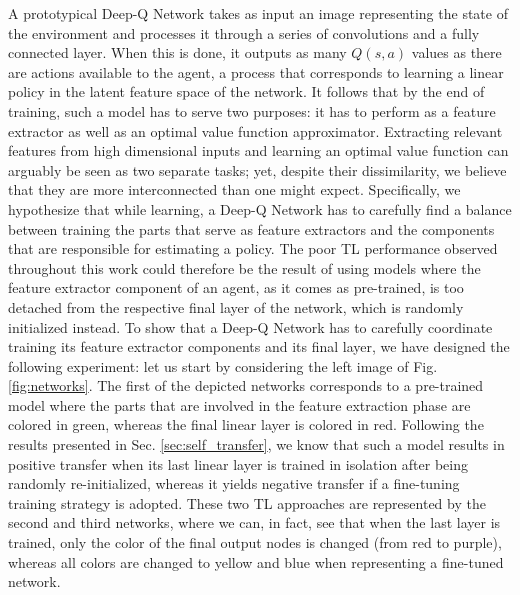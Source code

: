 A prototypical Deep-Q Network takes as input an image representing the state of the environment and processes it through a series of convolutions and a fully connected layer. When this is done, it outputs as many $Q(s,a)$ values as there are actions available to the agent, a process that corresponds to learning a linear policy in the latent feature space of the network. It follows that by the end of training, such a model has to serve two purposes: it has to perform as a feature extractor as well as an optimal value function approximator.
Extracting relevant features from high dimensional inputs and learning an optimal value function can arguably be seen as two separate tasks; yet, despite their dissimilarity, we believe that they are more interconnected than one might expect. Specifically, we hypothesize that while learning, a Deep-Q Network has to carefully find a balance between training the parts that serve as feature extractors and the components that are responsible for estimating a policy. The poor TL performance observed throughout this work could therefore be the result of using models where the feature extractor component of an agent, as it comes as pre-trained, is too detached from the respective final layer of the network, which is randomly initialized instead.   
To show that a Deep-Q Network has to carefully coordinate training its feature extractor components and its final layer, we have designed the following experiment: let us start by considering the left image of Fig. \ref{fig:networks}. The first of the depicted networks corresponds to a pre-trained model where the parts that are involved in the feature extraction phase are colored in green, whereas the final linear layer is colored in red. Following the results presented in Sec. \ref{sec:self_transfer}, we know that such a model results in positive transfer when its last linear layer is trained in isolation after being randomly re-initialized, whereas it yields negative transfer if a fine-tuning training strategy is adopted. These two TL approaches are represented by the second and third networks, where we can, in fact, see that when the last layer is trained, only the color of the final output nodes is changed (from red to purple), whereas all colors are changed to yellow and blue when representing a fine-tuned network.  


